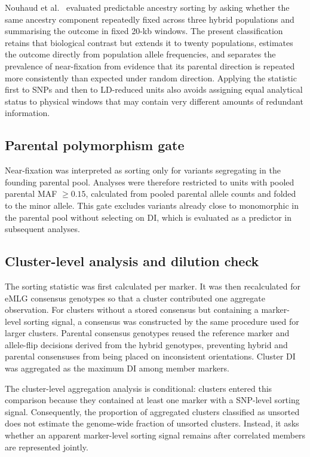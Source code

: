 \documentclass[11pt]{article}
\begin{document}
Nouhaud et al.~\cite{nouhaud2022} evaluated predictable ancestry sorting by
asking whether the same ancestry component repeatedly fixed across three hybrid
populations and summarising the outcome in fixed 20-kb windows. The present
classification retains that biological contrast but extends it to twenty
populations, estimates the outcome directly from population allele frequencies,
and separates the prevalence of near-fixation from evidence that its parental
direction is repeated more consistently than expected under random direction.
Applying the statistic first to SNPs and then to LD-reduced units also avoids
assigning equal analytical status to physical windows that may contain very
different amounts of redundant information.

\subsection{Parental polymorphism gate}

Near-fixation was interpreted as sorting only for variants segregating in the
founding parental pool. Analyses were therefore restricted to units with pooled
parental MAF \(\geq0.15\), calculated from pooled parental allele counts and
folded to the minor allele. This gate excludes variants already close to
monomorphic in the parental pool without selecting on DI, which is evaluated as
a predictor in subsequent analyses.

\subsection{Cluster-level analysis and dilution check}

The sorting statistic was first calculated per marker. It was then recalculated
for eMLG consensus genotypes so that a cluster contributed one aggregate
observation. For clusters without a stored consensus but containing a
marker-level sorting signal, a consensus was constructed by the same procedure
used for larger clusters. Parental consensus genotypes reused the reference
marker and allele-flip decisions derived from the hybrid genotypes, preventing
hybrid and parental consensuses from being placed on inconsistent orientations.
Cluster DI was aggregated as the maximum DI among member markers.

The cluster-level aggregation analysis is conditional: clusters entered this
comparison because they contained at least one marker with a SNP-level sorting
signal. Consequently, the proportion of aggregated clusters classified as
unsorted does not estimate the genome-wide fraction of unsorted clusters.
Instead, it asks whether an apparent marker-level sorting signal remains after
correlated members are represented jointly.
\end{document}
